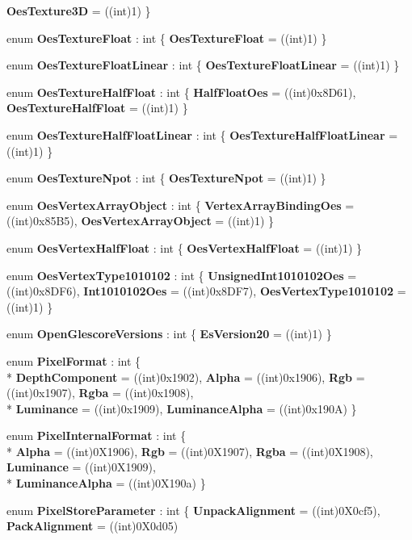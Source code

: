 \begin{DoxyCompactItemize}
{\bfseries Oes\-Texture3\-D} = ((int)1)
 \}
\item 
enum {\bfseries Oes\-Texture\-Float} \-: int \{ {\bfseries Oes\-Texture\-Float} = ((int)1)
 \}
\item 
enum {\bfseries Oes\-Texture\-Float\-Linear} \-: int \{ {\bfseries Oes\-Texture\-Float\-Linear} = ((int)1)
 \}
\item 
enum {\bfseries Oes\-Texture\-Half\-Float} \-: int \{ {\bfseries Half\-Float\-Oes} = ((int)0x8\-D61), 
{\bfseries Oes\-Texture\-Half\-Float} = ((int)1)
 \}
\item 
enum {\bfseries Oes\-Texture\-Half\-Float\-Linear} \-: int \{ {\bfseries Oes\-Texture\-Half\-Float\-Linear} = ((int)1)
 \}
\item 
enum {\bfseries Oes\-Texture\-Npot} \-: int \{ {\bfseries Oes\-Texture\-Npot} = ((int)1)
 \}
\item 
enum {\bfseries Oes\-Vertex\-Array\-Object} \-: int \{ {\bfseries Vertex\-Array\-Binding\-Oes} = ((int)0x85\-B5), 
{\bfseries Oes\-Vertex\-Array\-Object} = ((int)1)
 \}
\item 
enum {\bfseries Oes\-Vertex\-Half\-Float} \-: int \{ {\bfseries Oes\-Vertex\-Half\-Float} = ((int)1)
 \}
\item 
enum {\bfseries Oes\-Vertex\-Type1010102} \-: int \{ {\bfseries Unsigned\-Int1010102\-Oes} = ((int)0x8\-D\-F6), 
{\bfseries Int1010102\-Oes} = ((int)0x8\-D\-F7), 
{\bfseries Oes\-Vertex\-Type1010102} = ((int)1)
 \}
\item 
enum {\bfseries Open\-Glescore\-Versions} \-: int \{ {\bfseries Es\-Version20} = ((int)1)
 \}
\item 
enum {\bfseries Pixel\-Format} \-: int \{ \\*
{\bfseries Depth\-Component} = ((int)0x1902), 
{\bfseries Alpha} = ((int)0x1906), 
{\bfseries Rgb} = ((int)0x1907), 
{\bfseries Rgba} = ((int)0x1908), 
\\*
{\bfseries Luminance} = ((int)0x1909), 
{\bfseries Luminance\-Alpha} = ((int)0x190\-A)
 \}
\item 
enum {\bfseries Pixel\-Internal\-Format} \-: int \{ \\*
{\bfseries Alpha} = ((int)0\-X1906), 
{\bfseries Rgb} = ((int)0\-X1907), 
{\bfseries Rgba} = ((int)0\-X1908), 
{\bfseries Luminance} = ((int)0\-X1909), 
\\*
{\bfseries Luminance\-Alpha} = ((int)0\-X190a)
 \}
\item 
enum {\bfseries Pixel\-Store\-Parameter} \-: int \{ {\bfseries Unpack\-Alignment} = ((int)0\-X0cf5), 
{\bfseries Pack\-Alignment} = ((int)0\-X0d05)

\end{DoxyCompactItemize}
